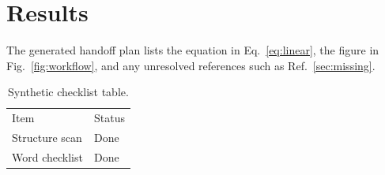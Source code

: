 \section{Results}
\label{sec:results}

The generated handoff plan lists the equation in Eq.~\ref{eq:linear}, the figure in Fig.~\ref{fig:workflow}, and any unresolved references such as Ref.~\ref{sec:missing}.

\begin{table}
\centering
\caption{Synthetic checklist table.}
\label{tab:checklist}
\begin{tabular}{ll}
Item & Status \\
Structure scan & Done \\
Word checklist & Done \\
\end{tabular}
\end{table}
